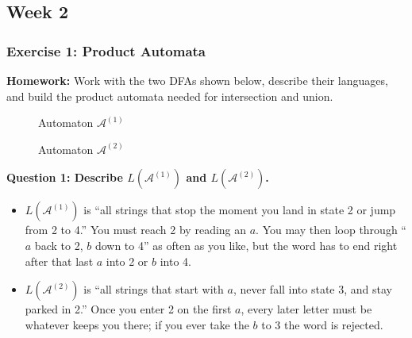 \documentclass{article}
\theoremstyle{theorem}
\theoremstyle{definition}
\theoremstyle{remark}
\begin{document}
\subsection{Week 2}

\subsubsection{Exercise 1: Product Automata}

\textbf{Homework:} Work with the two DFAs shown below, describe their languages, and build the product automata needed for intersection and union.

\begin{figure}[H]
  \centering
  \caption{Automaton $\mathcal{A}^{(1)}$}
\end{figure}

\begin{figure}[H]
  \centering
  \caption{Automaton $\mathcal{A}^{(2)}$}
\end{figure}

\textbf{Question 1: Describe $L(\mathcal{A}^{(1)})$ and $L(\mathcal{A}^{(2)})$.}

\begin{itemize}
  \item $L(\mathcal{A}^{(1)})$ is “all strings that stop the moment you land in state 2 or jump from 2 to 4.” You must reach 2 by reading an $a$. You may then loop through “$a$ back to 2, $b$ down to 4” as often as you like, but the word has to end right after that last $a$ into 2 or $b$ into 4.
  \item $L(\mathcal{A}^{(2)})$ is “all strings that start with $a$, never fall into state 3, and stay parked in 2.” Once you enter 2 on the first $a$, every later letter must be whatever keeps you there; if you ever take the $b$ to 3 the word is rejected.
\end{itemize}
\end{document}
